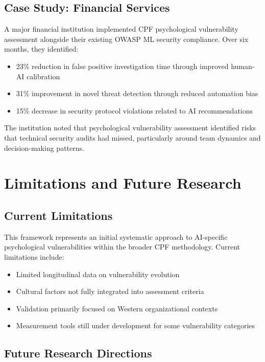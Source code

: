 \documentclass[11pt,a4paper]{article}
\begin{document}
\subsection{Case Study: Financial Services}

A major financial institution implemented CPF psychological vulnerability assessment alongside their existing OWASP ML security compliance. Over six months, they identified:

\begin{itemize}
\item 23\% reduction in false positive investigation time through improved human-AI calibration
\item 31\% improvement in novel threat detection through reduced automation bias
\item 15\% decrease in security protocol violations related to AI recommendations
\end{itemize}

The institution noted that psychological vulnerability assessment identified risks that technical security audits had missed, particularly around team dynamics and decision-making patterns.

\section{Limitations and Future Research}

\subsection{Current Limitations}

This framework represents an initial systematic approach to AI-specific psychological vulnerabilities within the broader CPF methodology\cite{canale2025}. Current limitations include:

\begin{itemize}
\item Limited longitudinal data on vulnerability evolution
\item Cultural factors not fully integrated into assessment criteria
\item Validation primarily focused on Western organizational contexts
\item Measurement tools still under development for some vulnerability categories
\end{itemize}

\subsection{Future Research Directions}
\end{document}
